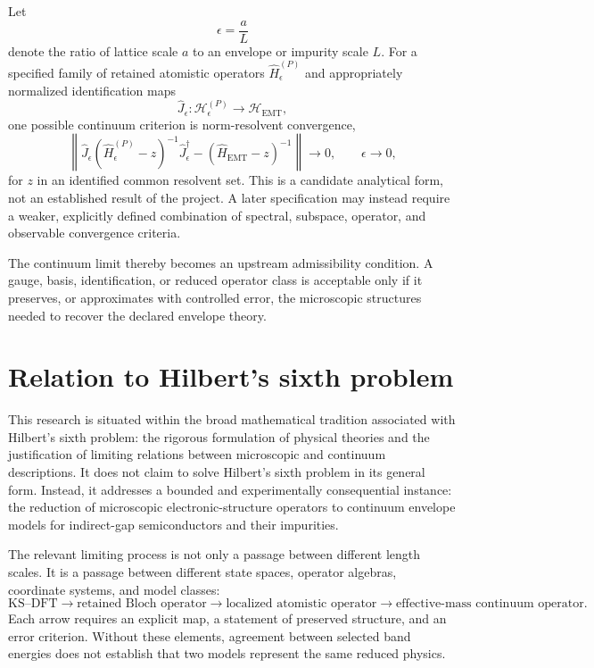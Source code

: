 Let
\begin{equation}
    \epsilon=\frac{a}{L}
\end{equation}
denote the ratio of lattice scale $a$ to an envelope or impurity scale $L$.
For a specified family of retained atomistic operators
$\hat H_\epsilon^{(P)}$ and appropriately normalized identification maps
\begin{equation}
    \hat J_\epsilon:
    \mathcal H_\epsilon^{(P)}
    \longrightarrow
    \mathcal H_{\mathrm{EMT}},
\end{equation}
one possible continuum criterion is norm-resolvent convergence,
\begin{equation}
    \left\|
        \hat J_\epsilon
        \left(\hat H_\epsilon^{(P)}-z\right)^{-1}
        \hat J_\epsilon^\dagger
        -
        \left(\hat H_{\mathrm{EMT}}-z\right)^{-1}
    \right\|
    \longrightarrow 0,
    \qquad
    \epsilon\longrightarrow 0,
\end{equation}
for $z$ in an identified common resolvent set. This is a candidate analytical
form, not an established result of the project. A later specification may
instead require a weaker, explicitly defined combination of spectral,
subspace, operator, and observable convergence criteria.

The continuum limit thereby becomes an upstream admissibility condition. A
gauge, basis, identification, or reduced operator class is acceptable only if
it preserves, or approximates with controlled error, the microscopic structures
needed to recover the declared envelope theory.

\section{Relation to Hilbert's sixth problem}

This research is situated within the broad mathematical tradition associated
with Hilbert's sixth problem: the rigorous formulation of physical theories and
the justification of limiting relations between microscopic and continuum
descriptions. It does not claim to solve Hilbert's sixth problem in its general
form. Instead, it addresses a bounded and experimentally consequential
instance: the reduction of microscopic electronic-structure operators to
continuum envelope models for indirect-gap semiconductors and their impurities.

The relevant limiting process is not only a passage between different length
scales. It is a passage between different state spaces, operator algebras,
coordinate systems, and model classes:
\begin{equation}
    \text{KS--DFT}
    \longrightarrow
    \text{retained Bloch operator}
    \longrightarrow
    \text{localized atomistic operator}
    \longrightarrow
    \text{effective-mass continuum operator}.
\end{equation}
Each arrow requires an explicit map, a statement of preserved structure, and an
error criterion. Without these elements, agreement between selected band
energies does not establish that two models represent the same reduced physics.

